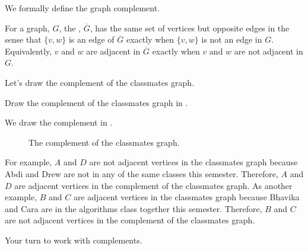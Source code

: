 We formally define the graph complement.

\begin{defn}
\label{defn_graph_complement}
    For a graph, $G$, the , $\overline{G}$, has the same set of vertices but opposite edges in the sense that $\{v,w\}$ is an edge of $\overline{G}$ exactly when $\{v,w\}$ is not an edge in $G$.  Equivalently, $v$ and $w$ are adjacent in $\overline{G}$ exactly when $v$ and $w$ are not adjacent in $G$.
\end{defn}

Let's draw the complement of the classmates graph.

\begin{exam}
\label{exam_classmates_comp}  
    Draw the complement of the classmates graph in .
        \begin{soln}
            We draw the complement in . 
            
                \begin{figure}[hbtp]
                    \centering
                    
                    \caption{The complement of the classmates graph.}
                    \label{fig_classmates_comp}
                \end{figure}
                
            For example, $A$ and $D$ are not adjacent vertices in the classmates graph because Abdi and Drew are not in any of the same classes this semester.  Therefore, $A$ and $D$ are adjacent vertices in the complement of the classmates graph.  As another example, $B$ and $C$ are adjacent vertices in the classmates graph because Bhavika and Cara are in the algorithms class together this semester. Therefore, $B$ and $C$ are not adjacent vertices in the complement of the classmates graph.
        \end{soln}
\end{exam}

Your turn to work with complements.

